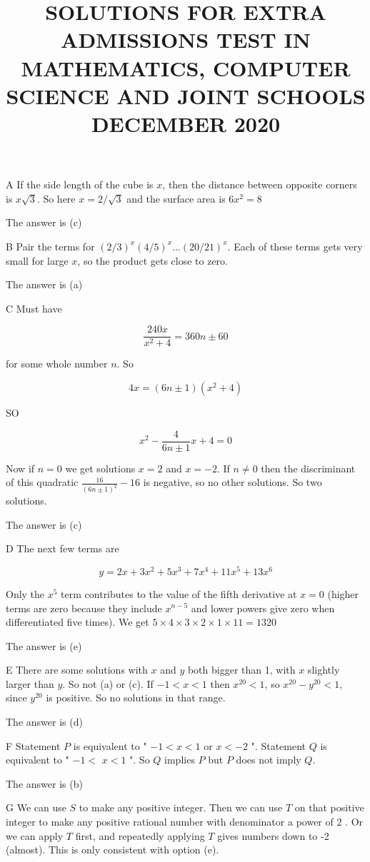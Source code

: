 \documentclass[10pt]{article}
\title{SOLUTIONS FOR EXTRA ADMISSIONS TEST IN \\
 MATHEMATICS, COMPUTER SCIENCE AND JOINT SCHOOLS DECEMBER 2020 }
\author{}
\date{}
\begin{document}
\maketitle
A If the side length of the cube is $x$, then the distance between opposite corners is $x \sqrt{3}$. So here $x=2 / \sqrt{3}$ and the surface area is $6 x^{2}=8$

The answer is (c)

B Pair the terms for $(2 / 3)^{x}(4 / 5)^{x} \ldots(20 / 21)^{x}$. Each of these terms gets very small for large $x$, so the product gets close to zero.

The answer is (a)

C Must have

$$
\frac{240 x}{x^{2}+4}=360 n \pm 60
$$

for some whole number $n$. So

$$
4 x=(6 n \pm 1)\left(x^{2}+4\right)
$$

SO

$$
x^{2}-\frac{4}{6 n \pm 1} x+4=0
$$

Now if $n=0$ we get solutions $x=2$ and $x=-2$. If $n \neq 0$ then the discriminant of this quadratic $\frac{16}{(6 n \pm 1)^{2}}-16$ is negative, so no other solutions. So two solutions.

The answer is (c)

D The next few terms are

$$
y=2 x+3 x^{2}+5 x^{3}+7 x^{4}+11 x^{5}+13 x^{6}
$$

Only the $x^{5}$ term contributes to the value of the fifth derivative at $x=0$ (higher terms are zero because they include $x^{n-5}$ and lower powers give zero when differentiated five times). We get $5 \times 4 \times 3 \times 2 \times 1 \times 11=1320$

The answer is (e)

E There are some solutions with $x$ and $y$ both bigger than 1, with $x$ slightly larger than $y$. So not (a) or (c). If $-1<x<1$ then $x^{20}<1$, so $x^{20}-y^{20}<1$, since $y^{20}$ is positive. So no solutions in that range.

The answer is (d)

F Statement $P$ is equivalent to " $-1<x<1$ or $x<-2$ ". Statement $Q$ is equivalent to " $-1<$ $x<1$ ". So $Q$ implies $P$ but $P$ does not imply $Q$.

The answer is (b)

G We can use $S$ to make any positive integer. Then we can use $T$ on that positive integer to make any positive rational number with denominator a power of 2 . Or we can apply $T$ first, and repeatedly applying $T$ gives numbers down to -2 (almost). This is only consistent with option (e).
\end{document}

